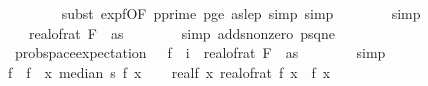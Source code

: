 \begin{isabellebody}
\ \ \ \ \ \ \ \isamarkupfalse%
\ {\isacharparenleft}{\kern0pt}subst\ exp{\isacharunderscore}{\kern0pt}f{}{\isacharbrackleft}{\kern0pt}OF\ p{\isacharunderscore}{\kern0pt}prime\ p{\isacharunderscore}{\kern0pt}ge{\isacharunderscore}{\kern0pt}{}\ as{\isacharunderscore}{\kern0pt}le{\isacharunderscore}{\kern0pt}p{\isacharbrackright}{\kern0pt}{\isacharcomma}{\kern0pt}\ simp{\isacharcomma}{\kern0pt}\ simp{\isacharparenright}{\kern0pt}\isanewline
\ \ \ \ \ \ \isamarkupfalse%
\ simp\isanewline
\ \ \ \ \isamarkupfalse%
\ \isamarkupfalse%
\ {\isachardoublequoteopen}{\isachardot}{\kern0pt}{\isachardot}{\kern0pt}{\isachardot}{\kern0pt}\ {\isacharequal}{\kern0pt}\ \ real{\isacharunderscore}{\kern0pt}of{\isacharunderscore}{\kern0pt}rat\ {\isacharparenleft}{\kern0pt}F\ {}\ as{\isacharparenright}{\kern0pt}{\isachardoublequoteclose}\isanewline
\ \ \ \ \ \ \isamarkupfalse%
\ {\isacharparenleft}{\kern0pt}simp\ add{\isacharcolon}{\kern0pt}s{}{\isacharunderscore}{\kern0pt}nonzero\ p{\isacharunderscore}{\kern0pt}sq{\isacharunderscore}{\kern0pt}ne{\isacharunderscore}{\kern0pt}{}{\isacharparenright}{\kern0pt}\isanewline
\ \ \ \ \isamarkupfalse%
\ \isamarkupfalse%
\ {\isachardoublequoteopen}\ prob{\isacharunderscore}{\kern0pt}space{\isachardot}{\kern0pt}expectation\ {\isasymOmega}\ {\isacharparenleft}{\kern0pt}{\isasymlambda}{\isasymomega}{\isachardot}{\kern0pt}\ f{}\ {\isasymomega}\ i{\isacharparenright}{\kern0pt}\ {\isacharequal}{\kern0pt}\ real{\isacharunderscore}{\kern0pt}of{\isacharunderscore}{\kern0pt}rat\ {\isacharparenleft}{\kern0pt}F\ {}\ as{\isacharparenright}{\kern0pt}{\isachardoublequoteclose}\isanewline
\ \ \ \ \ \ \isamarkupfalse%
\ simp\isanewline
\ \ \isamarkupfalse%
\isanewline
\isanewline
\ \ \isamarkupfalse%
\ f{\isacharprime}{\kern0pt}\ \ {\isachardoublequoteopen}f{\isacharprime}{\kern0pt}\ {\isacharequal}{\kern0pt}\ {\isacharparenleft}{\kern0pt}{\isasymlambda}x{\isachardot}{\kern0pt}\ median\ s\ {\isacharparenleft}{\kern0pt}f{}\ x{\isacharparenright}{\kern0pt}{\isacharparenright}{\kern0pt}{\isachardoublequoteclose}\isanewline
\ \ \isamarkupfalse%
\ real{\isacharunderscore}{\kern0pt}f{\isacharcolon}{\kern0pt}\ {\isachardoublequoteopen}{\isasymAnd}x{\isachardot}{\kern0pt}\ real{\isacharunderscore}{\kern0pt}of{\isacharunderscore}{\kern0pt}rat\ {\isacharparenleft}{\kern0pt}f\ x{\isacharparenright}{\kern0pt}\ {\isacharequal}{\kern0pt}\ f{\isacharprime}{\kern0pt}\ x{\isachardoublequoteclose}\isanewline

\end{isabellebody}
